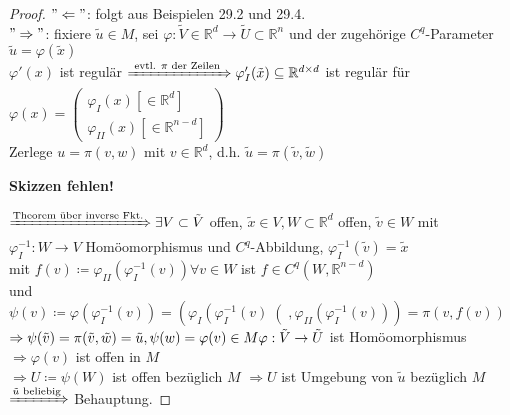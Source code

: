 \begin{proof}

$"\Leftarrow"$: folgt aus Beispielen 29.2 und 29.4. \\
$"\Rightarrow"$: fixiere $\tilde{u} \in M $, sei $\varphi : \tilde{V} \in \mathbb{R}^d
\rightarrow \tilde{U} \subset \mathbb{R}^n $ und der zugehörige $C^q$-Parameter 
$\tilde{u} = \varphi (\tilde{x})$ \\
$\varphi' (x)$ ist regulär $\xRightarrow{\text{ evtl. $\pi$ der Zeilen }} \varphi_I ' 
(\tilde{x}) \subseteq \mathbb{R}^{d \times d} $ ist regulär für $\varphi (x) =
    \begin{pmatrix}
    \varphi_I (x) \left[ \in \mathbb{R}^d \right]\\
    \varphi_{II} (x) \left[ \in \mathbb{R}^{n-d} \right]
    \end{pmatrix}
$ \\
Zerlege $u = \pi (v,w) $ mit $v \in \mathbb{R}^d $, 
d.h. $\tilde{u} = \pi (\tilde{v},\tilde{w})$

\textbf{Skizzen fehlen!}

$\xRightarrow{\text{Theorem über inverse Fkt.}} \exists V \subset \tilde{V} $ offen,
$\tilde{x} \in V, W \subset \mathbb{R}^d $ offen, $\tilde{v} \in W $
mit $\varphi_I ^{-1} : W \rightarrow V $ Homöomorphismus und $C^q$-Abbildung,
$\varphi_I ^{-1} (\tilde{v}) = \tilde{x} $ \\
mit $f(v) \coloneqq \varphi_{II} \left(\varphi_I ^{-1} (v)\right) \forall v \in W $ ist 
$f \in C^q \left(W, \mathbb{R}^{n-d}\right) $ \\
und $\psi (v) \coloneqq \varphi \left(\varphi_I ^{-1} (v) \right) =
\left( \varphi_I \left(\varphi_I ^{-1} (v) \right( ,
\varphi_{II} \left(\varphi_I ^ {-1} (v) \right) \right) = \pi \left(v, f(v)\right) $ \\
$\Rightarrow \psi (\tilde{v}) = \pi (\tilde{v}, \tilde{w}) = \tilde{u},
\psi (w) = \varphi (v) \in M \\
\varphi : \tilde{V} \rightarrow \tilde{U} $ ist Homöomorphismus \\
$\Rightarrow \varphi (v) $ ist offen in $M$ \\
$ \Rightarrow U \coloneqq \psi (W) $ ist offen bezüglich $M$
$\Rightarrow U $ ist Umgebung von $\tilde{u} $ bezüglich $M$ \\
$\xRightarrow{\tilde{u} \text{ beliebig}} $ Behauptung. 

\end{proof}

